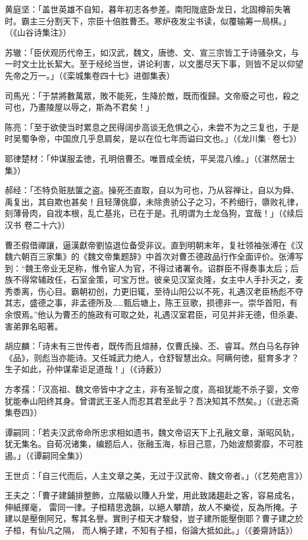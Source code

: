 黄庭坚：「盖世英雄不自知，暮年初志各参差。南阳陇底卧龙日，北固樽前失箸时。霸主三分割天下，宗臣十倍胜曹丕。寒炉夜发尘书读，似覆输筹一局棋。」（《山谷诗集注》）

苏辙：「臣伏观历代帝王，如汉武，魏文，唐徳、文、宣三宗皆工于诗骚杂文，与一时文士比长絜大。至于经纶当世，讲论利害，以文墨尽天下事，则皆不足以仰望先帝之万一。」（《栾城集卷四十七》进御集表）

司馬光：「于禁將數萬眾，敗不能死，生降於敵，既而復歸。文帝廢之可也，殺之可也，乃畫陵屋以辱之，斯為不君矣！」

陈亮：「至于欲使当时累息之民得阔步高谈无危惧之心，未尝不为之三复也，于是时吴蜀争帝，中国庶几乎息肩矣，是以在位七年而谥曰文也。」（《龙川集·卷七》）

耶律楚材：「仲谋服孟徳，孔明倍曹丕。唯晋成全统，平吴混八维。」（《湛然居士集》）

郝经：「丕特负赃胠箧之盗。操死丕直取，自以为可也，乃从容禅让，自以为舜、禹复出，其自欺也甚矣！且轻薄佻靡，未除贵骄公子之习，不矜细行，隳败礼律，刻薄骨肉，自戕本根，乱亡基兆，已在于是。孔明谓为土龙刍狗，宜哉！」（《续后汉书 卷二十六》）

曹丕假借禪讓，逼漢獻帝劉協退位备受非议。直到明朝末年，复社领袖张溥在《汉魏六朝百三家集》的《魏文帝集题辞》中首次对曹丕德政品行作全面评价。张溥写到：“魏王帝业无足称，惟令宦人为官，不得过诸署令。诏群臣不得奏事太后；后族不得常辅政任，石室金策，可宝万世。彼亲见汉室炎隆，女主中人手扑灭之，麦秀黍离，伤心目。霸朝初创，力更旧辄，至待山阳公以不死，礼遇汉老臣杨彪不夺其志，盛德之事，非孟德所及……甄后塘上，陈王豆歌，损德非一。崇华首阳，有余恨焉。”他认为曹丕的施政有可取之处，礼遇汉室君臣，可见并非无德，但杀妻、害弟罪名昭著。

胡应麟：「诗未有三世传者，既传而且煊赫，仅曹氏操、丕、睿耳。然白马名存钟《品》，则彪当亦能诗。又任城武力绝人，仓舒智慧出众。阿瞒何徳，挺育多才？生子如此，孙仲谋辈讵足道哉！」（《诗薮》）

方孝孺：「汉高祖、魏文帝皆中才之主，非有圣智之度，高祖犹能不杀子婴，文帝犹能奉山阳终其身。曾谓武王圣人而忍其君至此乎？吾决知其不然矣。」（《逊志斋集卷四》）

谭嗣同：「若夫汉武帝命所忠求相如遗书，魏文帝诏天下上孔融文章，渐昭风轨，犹无集名。自荀况诸集，编题后人，张融玉海，标目己意，乃始波颓雾靡，不可胜遏。」（《谭嗣同全集》）

王世贞：「自三代而后，人主文章之美，无过于汉武帝、魏文帝者。」（《艺苑疤言》）

王夫之：「曹子建鋪排整飾，立階級以賺人升堂，用此致諸趨赴之客，容易成名，伸紙揮毫， 雷同一律。子桓精思逸韻，以絕人攀躋，故人不樂從，反為所掩。子建以是壓倒阿兄，奪其名譽。實則子桓天才駿發，豈子建所能壓倒耶？曹子建之於子桓，有仙凡之隔， 而人稱子建，不知有子桓，俗論大抵如此。」（《姜齋詩話》）

